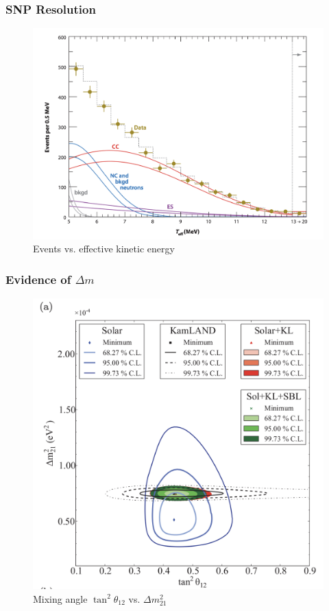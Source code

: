\documentclass[10pt]{beamer}
\begin{document}
	\begin{frame}
		\frametitle{SNP Resolution}
		\begin{center}
			\begin{figure}
				\includegraphics[scale=0.25]{plot2.png}
				\caption{Events vs. effective kinetic energy}
		\end{figure}
	\end{center}
	\end{frame}

	\begin{frame}
		\frametitle{Evidence of $\Delta m$}
		\begin{figure}
			\begin{center}
				\includegraphics[scale=0.25]{oscillations.png}
			\end{center}
			\caption{Mixing angle $\tan^2\theta_{12}$ vs. $\Delta m_{21}^2$}
		\end{figure}
	\end{frame}
\end{document}
